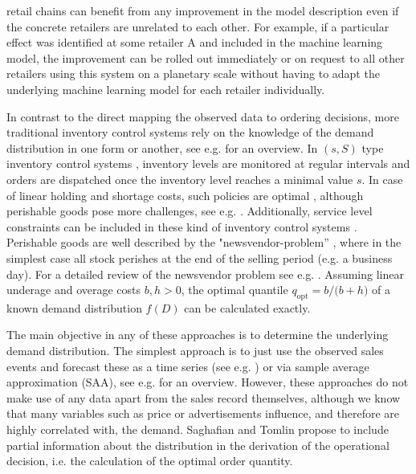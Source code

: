 \documentclass[BCOR=1mm, DIV=calc,10pt,
twoside=true,
twocolumn,
headings=normal]{scrartcl}
\begin{document}
retail chains can benefit from any improvement in the model description even if the concrete retailers are unrelated to each other. For example, if a particular effect was identified at some retailer A and included in the machine learning model, the improvement can be rolled out immediately or on request to all other retailers using this system on a planetary scale without having to adapt the underlying machine learning model for each retailer individually.

In contrast to the direct mapping the observed data to ordering decisions, more traditional inventory control systems rely on the knowledge of the demand distribution in one form or another, see e.g. \cite{silver1998} for an overview. In $(s,S)$ type inventory control systems \cite{Scarf1958}, inventory levels are monitored at regular intervals and orders are dispatched once the inventory level reaches a minimal value $s$. In case of linear holding and shortage costs, such policies are optimal \cite{Scarf1959}, although perishable goods pose more challenges, see e.g. \cite{Nahmias1973,Nahmias1975,nahmias1978}. Additionally, service level constraints can be included in these kind of inventory control systems \cite{minner2010periodic}. Perishable goods are well described by the "newsvendor-problem'' \cite{Edgeworth}, where in the simplest case all stock perishes at the end of the selling period (e.g. a business day). For a detailed review of the newsvendor problem see e.g. \cite{Khouja1999537}. Assuming linear underage and overage costs $b,h >0$, the optimal quantile $q_{\mathrm{opt}} = {b}/{(b+h})$ of a known demand distribution $f(D)$ can be calculated exactly.

The main objective in any of these approaches is to determine the underlying demand distribution. The simplest approach is to just use the observed sales events and forecast these as a time series (see e.g. \cite{alwan2016}) or via sample average approximation (SAA), see e.g. \cite{shapiro2014} for an overview. However, these approaches do not make use of any data apart from the sales record themselves, although we know that many variables such as price or advertisements influence, and therefore are highly correlated with, the demand. Saghafian and Tomlin \cite{saghafian2016newsvendor} propose to include partial information about the distribution in the derivation of the operational decision, i.e. the  calculation of the optimal order quantity.
\end{document}
